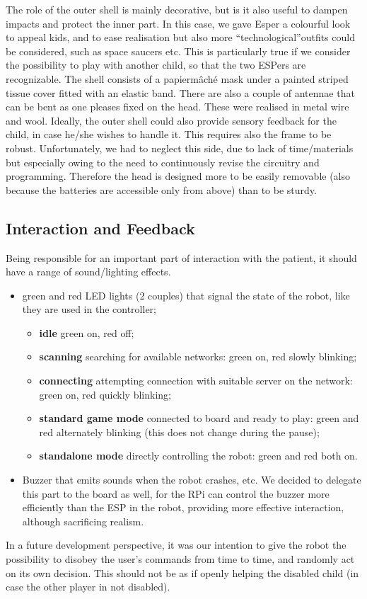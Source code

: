 \documentclass[a4paper,twoside]{book}
\begin{document}
The role of the outer shell is mainly decorative, but is it also useful to dampen impacts and protect the inner part. In this case, we gave Esper a colourful look to appeal kids, and to ease realisation but also more \textquotedblleft technological\textquotedblright outfits could be considered, such as space saucers etc. This is particularly true if we consider the possibility to play with another child, so that the two ESPers are recognizable.
The shell consists of a papier\textendash m\^{a}ch\'{e} mask under a painted striped tissue cover fitted with an elastic band. There are also a couple of antennae that can be bent as one pleases fixed on the head. These were realised in metal wire and wool.
Ideally, the outer shell could also provide sensory feedback for the child, in case he/she wishes to handle it.
This requires also the frame to be robust. Unfortunately, we had to neglect this side, due to lack of time/materials but especially owing to the need to continuously revise the circuitry and programming. Therefore the head is designed more to be easily removable (also because the batteries are accessible only from above) than to be sturdy.

\subsection{Interaction and Feedback}

\beforelist* Being responsible for an important part of interaction with the patient, it should have a range of sound/lighting effects.
\begin{itemize}
\item green and red LED lights (2 couples) that signal the state of the robot, like they are used in the controller;
  \begin{itemize}
  \item \textbf{idle} green on, red off;
  \item \textbf{scanning} searching for available networks: green on, red slowly blinking;
  \item \textbf{connecting} attempting connection with suitable server on the network: green on, red quickly blinking;
  \item \textbf{standard game mode} connected to board and ready to play: green and red alternately blinking (this does not change during the pause);
  \item \textbf{standalone mode} directly controlling the robot: green and red both on.
  \end{itemize}
\item Buzzer that emits sounds when the robot crashes, etc. We decided to delegate this part to the board as well, for the RPi can control the buzzer more efficiently than the ESP in the robot, providing more effective interaction, although sacrificing realism.
\end{itemize}
\afterlist*
In a future development perspective, it was our intention to give the robot the possibility to disobey the user's commands from time to time, and randomly act on its own decision. This should not be as if openly helping the disabled child (in case the other player in not disabled).
\end{document}
